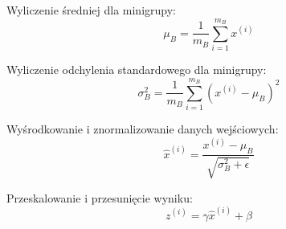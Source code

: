 \documentclass[a4paper,11pt]{article}
\begin{document}
    \bigskip

    Wyliczenie średniej dla minigrupy: \\
    \begin{equation}
        \label{equ:minibatch_mean}
        \mu_{B} = \frac{1}{m_{B}} \displaystyle\sum_{i=1}^{m_{B}} x^{(i)}
    \end{equation}

    \smallskip

    Wyliczenie odchylenia standardowego dla minigrupy: \\
    \begin{equation}
        \label{equ:minibatch_std_dev}
        \sigma_{B}^{2} = \frac{1}{m_{B}} \displaystyle\sum_{i=1}^{m_{B}} (x^{(i)} - \mu_{B})^{2}
    \end{equation}

    \smallskip

    Wyśrodkowanie i znormalizowanie danych wejściowych: \\
    \begin{equation}
        \label{equ:centering_and_normalizing_input}
        \widehat{x}^{(i)} = \frac{x^{(i)} - \mu_{B}}{\sqrt{\sigma_{B}^{2} + \epsilon}}
    \end{equation}

    \smallskip

    Przeskalowanie i przesunięcie wyniku: \\
    \begin{equation}
        \label{equ:rescaling_and_translating_result}
        z^{(i)} = \gamma\widehat{x}^{(i)} + \beta
    \end{equation}

    \smallskip
\end{document}
